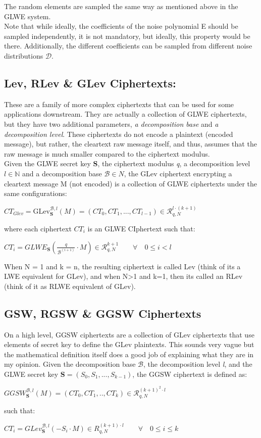 \documentclass{report}
\begin{document}
The random elements are sampled the same way as mentioned above in the GLWE system.\\
Note that while ideally, the coefficients of the noise polynomial E should be sampled independently, it is not mandatory, but ideally, this property would be there. Additionally, the different coefficients can be sampled from different noise distributions $\mathcal{D}$.

\subsection{Lev, RLev \& GLev Ciphertexts:}
These are a family of more complex ciphertexts that can be used for some applications downstream. They are actually a collection of GLWE ciphertexts, but they have two additional parameters, \textit{a decomposition base} and \textit{a decomposition level}. These ciphertexts do not encode a plaintext (encoded message), but rather, the cleartext raw message itself, and thus, assumes that the raw message is much smaller compared to the ciphertext modulus.\\
Given the GLWE secret key \textbf{S}, the ciphertext modulus \textit{q}, a decomposition level $l \in \mathbb{N}$ and a decomposition base $\mathcal{B} \in N$, the GLev ciphertext encrypting a cleartext message M (not encoded) is a collection of GLWE ciphertexts under the same configurations:
\begin{center}
	$CT_{Glev} = \text{GLev}_\textbf{S}^{\mathcal{B}, l} (M) = (CT_0, CT_1, ..., CT_{l-1}) \in \mathcal{R}_{q, N}^{l \cdot (k+1)}$
\end{center}
where each ciphertext $CT_i$ is an GLWE CIphertext such that:
\begin{center}
	$CT_i = GLWE_\textbf{S} (\frac{q}{\mathcal{B}^{(i+1)}} \cdot M) \in \mathcal{R}_{q, N}^{k+1} \qquad \forall \quad 0 \leq i < l$ 
\end{center}

When N = 1 and k = n, the resulting ciphertext is called Lev (think of its a LWE equivalent for GLev), and when N>1 and k=1, then its called an RLev (think of it as RLWE  equivalent of GLev).

\subsection{GSW, RGSW \& GGSW Ciphertexts}
On a high level, GGSW ciphertexts are a collection of GLev ciphertexts that use elements of secret key to define the GLev plaintexts. This sounds very vague but the mathematical definition itself does a good job of explaining what they are in my opinion. 
Given the decomposition base $\mathcal{B}$, the decomposition level \textit{l}, and the GLWE secret key $\textbf{S} = (S_0, S_1, ..., S_{k-1})$, the GGSW ciphertext is defined as:
\begin{center}
	$GGSW_\textbf{S}^{\mathcal{B}, \textit{l}}(M) = (CT_0, CT_1, .., CT_k) \in \mathcal{R}_{q, N}^{(k+1)^2 \cdot l}$
\end{center}
such that:
\begin{center}
	$CT_i = GLev_\textbf{S}^{\mathcal{B}, \textit{l}} (-S_i \cdot M) \in R_{q, N}^{(k+1) \cdot l} \qquad \forall \quad 0 \leq i \leq k$
\end{center}
\end{document}
